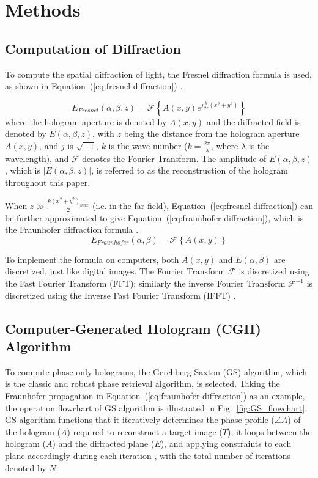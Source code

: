 	
\section{Methods}
\subsection{Computation of Diffraction}
	To compute the spatial diffraction of light, the Fresnel diffraction formula is used, as shown in Equation~(\ref{eq:fresnel-diffraction}) \cite{Goodman2017}.
	
	\begin{equation}
	  E_{Fresnel}(\alpha, \beta, z) = \mathcal{F} \left\{A(x,y)e^{j\frac{k}{2z}(x^2+y^2)}\right\}
	  \label{eq:fresnel-diffraction}
	\end{equation}
	where the hologram aperture is denoted by $A(x, y)$ and the diffracted field is denoted by $E(\alpha, \beta, z)$, with $z$ being the distance from the hologram aperture $A(x, y)$, and $j$ is $\sqrt{-1}$, $k$ is the wave number ($k=\frac{2\pi}{\lambda}$, where $\lambda$ is the wavelength), and $\mathcal{F}$ denotes the Fourier Transform. The amplitude of $E(\alpha, \beta, z)$, which is $|E(\alpha, \beta, z)|$, is referred to as the reconstruction of the hologram throughout this paper.
	
	When $z\gg \frac{k(x^2+y^2)_{max}}{2}$ (i.e. in the far field), Equation~(\ref{eq:fresnel-diffraction}) can be further approximated to give Equation~(\ref{eq:fraunhofer-diffraction}), which is the Fraunhofer diffraction formula \cite{Goodman2017}.
	\begin{equation}
	  E_{Fraunhofer}(\alpha, \beta) = \mathcal{F} \left\{A(x,y)\right\}
	  \label{eq:fraunhofer-diffraction}
	\end{equation}
	
	To implement the formula on computers, both $A(x, y)$ and $E(\alpha, \beta)$ are discretized, just like digital images. The Fourier Transform $\mathcal{F}$ is discretized using the Fast Fourier Transform (FFT); similarly the inverse Fourier Transform $\mathcal{F}^{-1}$ is discretized using the Inverse Fast Fourier Transform (IFFT) \cite{Cochran1967}.
	
	
\subsection{Computer-Generated Hologram (CGH) Algorithm}
	To compute phase-only holograms, the Gerchberg-Saxton (GS) \cite{Gerchberg1972} algorithm, which is the classic and robust phase retrieval algorithm, is selected. Taking the Fraunhofer propagation in Equation~(\ref{eq:fraunhofer-diffraction}) as an example, the operation flowchart of GS algorithm is illustrated in Fig.~\ref{fig:GS_flowchart}. GS algorithm functions that it iteratively determines the phase profile ($\angle A$) of the hologram ($A$) required to reconstruct a target image ($T$); it loops between the hologram ($A$) and the diffracted plane ($E$), and applying constraints to each plane accordingly during each iteration \cite{Gerchberg1972}, with the total number of iterations denoted by $N$. 
	
